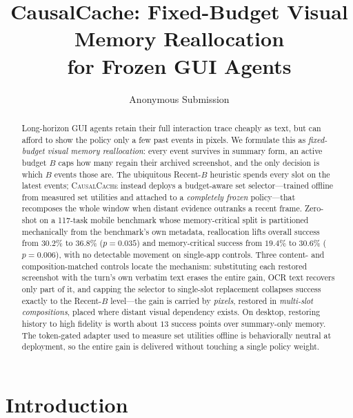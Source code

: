 \documentclass[letterpaper]{article} %
\title{CausalCache: Fixed-Budget Visual Memory Reallocation\\for Frozen GUI Agents}
\author{Anonymous Submission}
\newcommand{\method}{\textsc{CausalCache}}
\begin{document}
\maketitle

\begin{abstract}
Long-horizon GUI agents retain their full interaction trace cheaply as
text, but can afford to show the policy only a few past events in pixels.
We formulate this as \emph{fixed-budget visual memory reallocation}: every
event survives in summary form, an active budget $B$ caps how many regain
their archived screenshot, and the only decision is which $B$ events those
are. The ubiquitous Recent-$B$ heuristic spends every slot on the latest
events; \method{} instead deploys a budget-aware set selector---trained
offline from measured set utilities and attached to a \emph{completely
frozen} policy---that recomposes the whole window when distant evidence
outranks a recent frame. Zero-shot on a 117-task mobile benchmark whose
memory-critical split is partitioned mechanically from the benchmark's own
metadata, reallocation lifts overall success from $30.2\%$ to $36.8\%$
($p{=}0.035$) and memory-critical success from $19.4\%$ to $30.6\%$
($p{=}0.006$), with no detectable movement on single-app controls. Three
content- and composition-matched controls locate the mechanism:
substituting each restored screenshot with the turn's own verbatim text
erases the entire gain, OCR text recovers only part of it, and capping the
selector to single-slot replacement collapses success exactly to the
Recent-$B$ level---the gain is carried by \emph{pixels}, restored in
\emph{multi-slot compositions}, placed where distant visual dependency
exists. On desktop, restoring history to high fidelity is worth about
$13$ success points over summary-only memory. The token-gated adapter used
to measure set utilities offline is behaviorally neutral at deployment, so
the entire gain is delivered without touching a single policy weight.
\end{abstract}

\section{Introduction}
\end{document}
